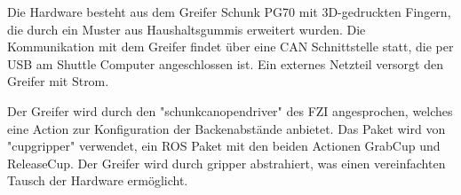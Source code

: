 Die Hardware besteht aus dem Greifer Schunk PG70 mit 3D-gedruckten Fingern, die durch ein Muster aus Haushaltsgummis erweitert wurden. Die Kommunikation mit dem Greifer findet über eine CAN Schnittstelle statt, die per USB am Shuttle Computer angeschlossen ist. Ein externes Netzteil versorgt den Greifer mit Strom.

Der Greifer wird durch den "schunk\textunderscore canopen\textunderscore driver" des FZI angesprochen, welches eine Action zur Konfiguration der Backenabstände anbietet. Das Paket wird von "cup\textunderscore gripper" verwendet, ein ROS Paket mit den beiden Actionen GrabCup und ReleaseCup. Der Greifer wird durch gripper abstrahiert, was einen vereinfachten Tausch der Hardware ermöglicht.
